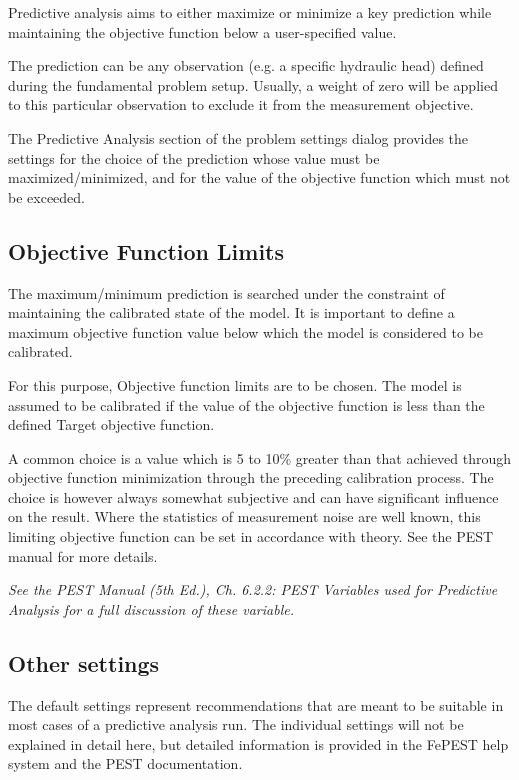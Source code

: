 Predictive analysis aims to either maximize or minimize a key prediction while maintaining the objective function below a user-specified value. 

The prediction can be any observation (e.g. a specific hydraulic head) defined during the fundamental problem setup. Usually, a weight of zero will be applied to this particular observation to exclude it from the measurement objective.

The Predictive Analysis section of the problem settings dialog provides the settings for the choice of the prediction whose value must be maximized/minimized, and for the value of the objective function which must not be exceeded.

\subsection{Objective Function Limits}

The maximum/minimum prediction is searched under the constraint of maintaining the calibrated state of the model. It is important to define a maximum objective function value below which the model is considered to be calibrated.

For this purpose, Objective function limits are to be chosen. The model is assumed to be calibrated if the value of the objective function is less than the defined Target objective function. 

A common choice is a value which is 5 to 10\% greater than that achieved through objective function minimization through the preceding calibration process. The choice is however always somewhat subjective and can have significant influence on the result. Where the statistics of measurement noise are well known, this limiting objective function can be set in accordance with theory. See the PEST manual for more details.

\textit{ See the PEST Manual (5th Ed.), Ch. 6.2.2: PEST Variables used for Predictive Analysis for a full discussion of these variable.}


\subsection{Other settings}

The default settings represent recommendations that are meant to be suitable in most cases of a predictive analysis run. The individual settings will not be explained in detail here, but detailed information is provided in the FePEST help system and the PEST documentation.


